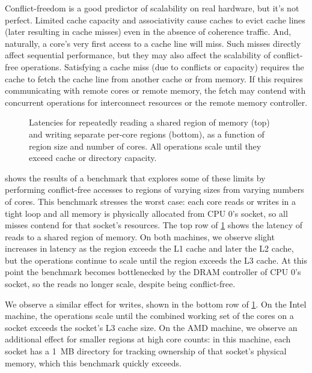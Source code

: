 Conflict-freedom is a good predictor of scalability on real hardware,
but it's not perfect.  Limited cache capacity and associativity cause
caches to evict cache lines (later resulting in cache
misses) even in the absence of coherence traffic.
%
And, naturally, a core's
very first access to a cache line will miss.  Such misses directly
affect sequential performance, but they may also affect the
scalability of conflict-free operations.
%
Satisfying a cache miss (due to conflicts or capacity) requires the
cache to fetch the cache line from another cache or from memory.
%
If this requires communicating with remote cores or remote memory, the
fetch may contend with concurrent operations for interconnect
resources or the remote memory controller.

\begin{figure}
  \centering
  \caption{Latencies for repeatedly reading a shared region of memory
    (top) and writing separate per-core regions (bottom), as a
    function of region size and number of cores.  All operations scale
    until they exceed cache or directory capacity.}
  \label{fig:memscan}
\end{figure}

 shows the results of a benchmark that explores some
of these limits by performing conflict-free accesses to regions of
varying sizes from varying numbers of cores.
%
This benchmark stresses the worst case: each core reads or writes in a
tight loop and all memory is physically allocated from CPU 0's socket,
so all misses contend for that socket's resources.
%
The top row of \cref{fig:memscan} shows the latency of reads to a
shared region of memory.
%
On both
machines, we observe slight increases in latency as the region exceeds
the L1 cache and later the L2 cache, but the operations continue to
scale until the region exceeds the L3 cache.  At this point the
benchmark becomes bottlenecked by the DRAM controller of CPU 0's
socket, so the reads no longer scale, despite being conflict-free.

We observe a similar effect for writes, shown in the bottom row of
\cref{fig:memscan}.  On the Intel machine, the operations scale until
the combined working set of the cores on a socket exceeds the socket's
L3 cache size.  On the AMD machine, we observe an additional
effect for smaller regions at high core counts: in this machine,
each socket has a 1~MB directory for tracking ownership of that
socket's physical memory, which this benchmark quickly exceeds.

